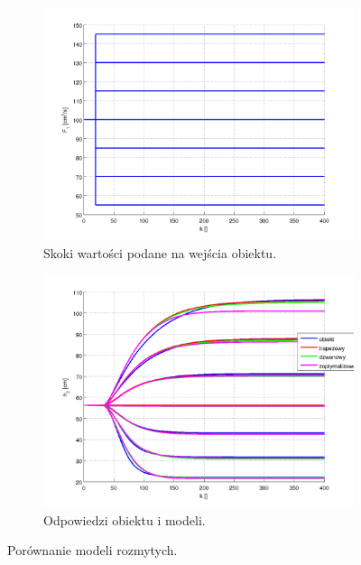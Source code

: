 \documentclass[a4paper,12pt]{article}
\begin{document}
\begin{figure}[h]
   \centering
   \begin{subfigure}[h]{0.45\textwidth}
      \includegraphics[width=\textwidth]{img/fuzzy_comparison_1a.png}
      \caption{Skoki wartości podane na wejścia obiektu.}
   \end{subfigure}
   \begin{subfigure}[h]{0.45\textwidth}
      \includegraphics[width=\textwidth]{img/fuzzy_comparison_1b.png}
      \caption{Odpowiedzi obiektu i modeli.}
   \end{subfigure}
   \caption{Porównanie modeli rozmytych.}
   \label{img:fuzzy_comparison}
\end{figure}
\end{document}
